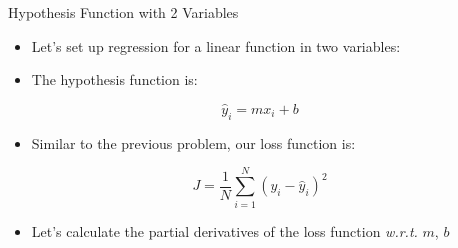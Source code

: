 \begin{frame}{Hypothesis Function with 2 Variables}
    \begin{itemize}
        \item Let’s set up regression for a linear function in two variables:
        \item The hypothesis function is:
    \end{itemize}

    \begin{center}
        \[
        \hat{y}_i = mx_i + b
        \]
    \end{center}

    \begin{itemize}
        \item Similar to the previous problem, our loss function is:
    \end{itemize}

    \begin{center}
        \[
        J = \frac{1}{N} \sum_{i=1}^{N} (y_i - \hat{y}_i)^2
        \]
    \end{center}

    \begin{itemize}
        \item Let’s calculate the partial derivatives of the loss function \textit{w.r.t.} $m$, $b$
    \end{itemize}
\end{frame}


